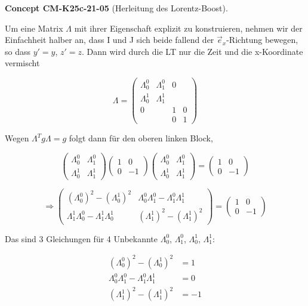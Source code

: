 \documentclass[10pt, letterpaper]{article}
\newcommand{\CustomHeading}[3]{%
  \par\medskip\noindent%
  \textbf{#1 #2} \textnormal{(#3)}.\enskip%
}
\newenvironment{CONC}[2]{\begin{unitbox}\CustomHeading{Concept}{#1}{#2}}{\end{unitbox}}
\begin{document}
\begin{CONC}{CM-K25c-21-05}{Herleitung des Lorentz-Boost}
Um eine Matrix $\Lambda$ mit ihrer Eigenschaft explizit zu konstruieren, nehmen wir der Einfachheit halber an, dass I und J sich beide fallend der $\vec{e}_x$-Richtung bewegen, so dass $y'=y$, $z'=z$. Dann wird durch die LT nur die Zeit und die x-Koordinate vermischt

\[\Lambda = \begin{pmatrix}
\Lambda^0_0 & \Lambda^0_1 & 0 \\
\Lambda^1_0 & \Lambda^1_1 & \\
0 & & 1 & 0 \\
& & 0 & 1
\end{pmatrix}\]

Wegen $\Lambda^T g \Lambda = g$ folgt dann für den oberen linken Block,

\[\begin{pmatrix}
\Lambda^0_0 & \Lambda^0_1 \\
\Lambda^1_0 & \Lambda^1_1
\end{pmatrix}
\begin{pmatrix}
1 & 0 \\
0 & -1
\end{pmatrix}
\begin{pmatrix}
\Lambda^0_0 & \Lambda^0_1 \\
\Lambda^1_0 & \Lambda^1_1
\end{pmatrix} = 
\begin{pmatrix}
1 & 0 \\
0 & -1
\end{pmatrix}\]

\[\Rightarrow \begin{pmatrix}
(\Lambda^0_0)^2 - (\Lambda^1_0)^2 & \Lambda^0_0\Lambda^0_1 - \Lambda^0_1\Lambda^1_1 \\
\Lambda^1_1\Lambda^0_0 - \Lambda^1_1\Lambda^1_0 & (\Lambda^1_1)^2 - (\Lambda^1_1)^2
\end{pmatrix} = 
\begin{pmatrix}
1 & 0 \\
0 & -1
\end{pmatrix}\]

Das sind 3 Gleichungen für 4 Unbekannte $\Lambda^0_0$, $\Lambda^0_1$, $\Lambda^1_0$, $\Lambda^1_1$:

\begin{align*}
(\Lambda^0_0)^2 - (\Lambda^1_0)^2 &= 1 \tag{1} \\
\Lambda^0_0\Lambda^0_1-\Lambda^0_1\Lambda^1_1 &= 0 \tag{2} \\
(\Lambda^1_1)^2 - (\Lambda^1_1)^2 &= -1 \tag{3}
\end{align*}


\end{CONC}
\end{document}
